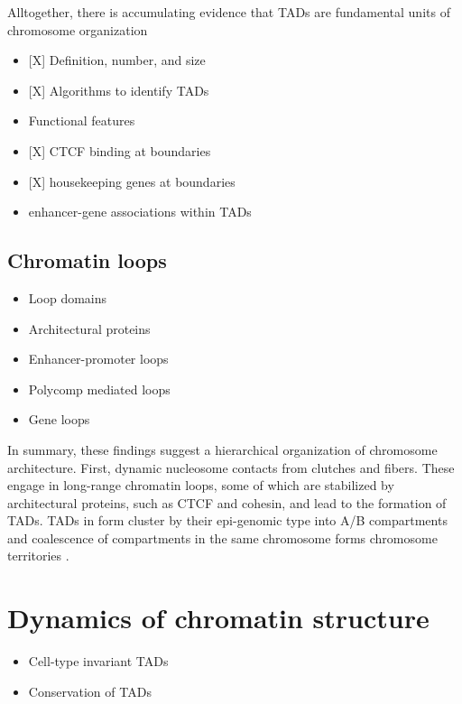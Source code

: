 \documentclass[a4paper,twoside=true,openright,parskip=full,chapterprefix=true,11pt,headings=normal,bibliography=totoc,listof=totoc,titlepage=on,captions=tableabove,draft=false]{scrreprt}
\providecommand{\tightlist}{%
  \setlength{\itemsep}{0pt}\setlength{\parskip}{0pt}}
\theoremstyle{definition}
\theoremstyle{definition}
\theoremstyle{definition}
\theoremstyle{remark}
\begin{document}
Alltogether, there is accumulating evidence that TADs are fundamental
units of chromosome organization \citep{Dixon2016}

\begin{itemize}
\tightlist
\item
  {[}X{]} Definition, number, and size
\item
  {[}X{]} Algorithms to identify TADs
\item
  Functional features
\item
  {[}X{]} CTCF binding at boundaries
\item
  {[}X{]} housekeeping genes at boundaries
\item
  enhancer-gene associations within TADs
\end{itemize}

\subsection{Chromatin loops}\label{chromatin-loops}

\begin{itemize}
\tightlist
\item
  Loop domains
\item
  Architectural proteins
\item
  Enhancer-promoter loops
\item
  Polycomp mediated loops
\item
  Gene loops
\end{itemize}

In summary, these findings suggest a hierarchical organization of
chromosome architecture. First, dynamic nucleosome contacts from
clutches and fibers. These engage in long-range chromatin loops, some of
which are stabilized by architectural proteins, such as CTCF and
cohesin, and lead to the formation of TADs. TADs in form cluster by
their epi-genomic type into A/B compartments and coalescence of
compartments in the same chromosome forms chromosome territories
\citep{Bonev2016}.

\section{Dynamics of chromatin
structure}\label{dynamics-of-chromatin-structure}

\begin{itemize}
\tightlist
\item
  Cell-type invariant TADs\\
\item
  Conservation of TADs
\end{itemize}
\end{document}
